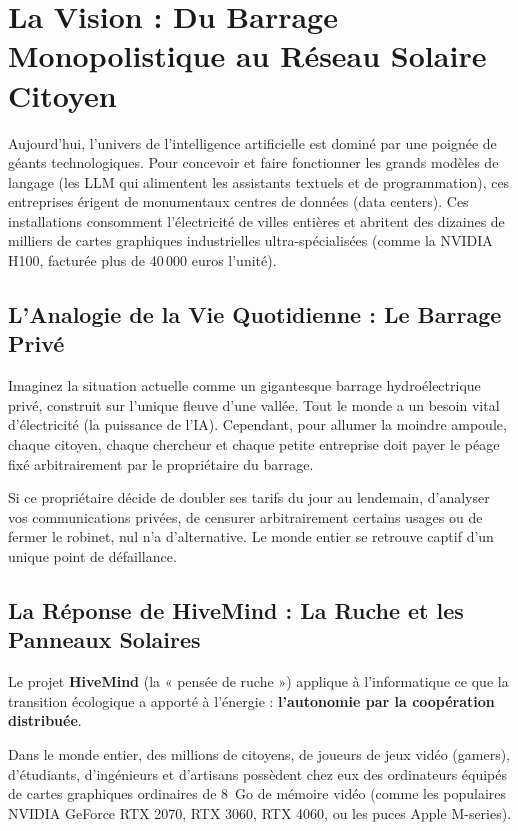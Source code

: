\documentclass[11pt,a4paper]{article}
\begin{document}
\section{La Vision : Du Barrage Monopolistique au Réseau Solaire Citoyen}

Aujourd'hui, l'univers de l'intelligence artificielle est dominé par une poignée de géants technologiques. Pour concevoir et faire fonctionner les grands modèles de langage (les LLM qui alimentent les assistants textuels et de programmation), ces entreprises érigent de monumentaux centres de données (data centers). Ces installations consomment l'électricité de villes entières et abritent des dizaines de milliers de cartes graphiques industrielles ultra-spécialisées (comme la NVIDIA H100, facturée plus de 40\,000 euros l'unité).

\subsection{L'Analogie de la Vie Quotidienne : Le Barrage Privé}
Imaginez la situation actuelle comme un gigantesque barrage hydroélectrique privé, construit sur l'unique fleuve d'une vallée. Tout le monde a un besoin vital d'électricité (la puissance de l'IA). Cependant, pour allumer la moindre ampoule, chaque citoyen, chaque chercheur et chaque petite entreprise doit payer le péage fixé arbitrairement par le propriétaire du barrage.

Si ce propriétaire décide de doubler ses tarifs du jour au lendemain, d'analyser vos communications privées, de censurer arbitrairement certains usages ou de fermer le robinet, nul n'a d'alternative. Le monde entier se retrouve captif d'un unique point de défaillance.

\subsection{La Réponse de HiveMind : La Ruche et les Panneaux Solaires}
Le projet \textbf{HiveMind} (la « pensée de ruche ») applique à l'informatique ce que la transition écologique a apporté à l'énergie : \textbf{l'autonomie par la coopération distribuée}.

Dans le monde entier, des millions de citoyens, de joueurs de jeux vidéo (gamers), d'étudiants, d'ingénieurs et d'artisans possèdent chez eux des ordinateurs équipés de cartes graphiques ordinaires de 8~Go de mémoire vidéo (comme les populaires NVIDIA GeForce RTX 2070, RTX 3060, RTX 4060, ou les puces Apple M-series). 
\end{document}
